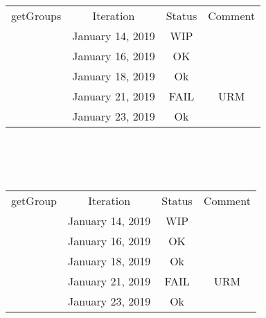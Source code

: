\documentclass{scrreprt}
\begin{document}
	\begin{tabularx}{12cm}{X|c|c|c}
		getGroups & Iteration & Status & Comment  \\
		& January 14, 2019 & WIP & \\
		& January 16, 2019 & OK & \\
		& January 18, 2019 & Ok & \\
		& January 21, 2019 & FAIL & URM \\
		& January 23, 2019 & Ok & \\
	\end{tabularx}	
	\\ \\ \\
	\begin{tabularx}{12cm}{X|c|c|c}
		getGroup & Iteration & Status & Comment  \\
		& January 14, 2019 & WIP & \\
		& January 16, 2019 & OK & \\
		& January 18, 2019 & Ok & \\
		& January 21, 2019 & FAIL & URM \\
		& January 23, 2019 & Ok & \\
	\end{tabularx}
	
\end{document}
